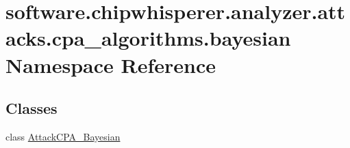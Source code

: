 \hypertarget{namespacesoftware_1_1chipwhisperer_1_1analyzer_1_1attacks_1_1cpa__algorithms_1_1bayesian}{}\section{software.\+chipwhisperer.\+analyzer.\+attacks.\+cpa\+\_\+algorithms.\+bayesian Namespace Reference}
\label{namespacesoftware_1_1chipwhisperer_1_1analyzer_1_1attacks_1_1cpa__algorithms_1_1bayesian}
\subsection*{Classes}
\begin{DoxyCompactItemize}
\item 
class \hyperlink{classsoftware_1_1chipwhisperer_1_1analyzer_1_1attacks_1_1cpa__algorithms_1_1bayesian_1_1AttackCPA__Bayesian}{Attack\+C\+P\+A\+\_\+\+Bayesian}
\end{DoxyCompactItemize}
